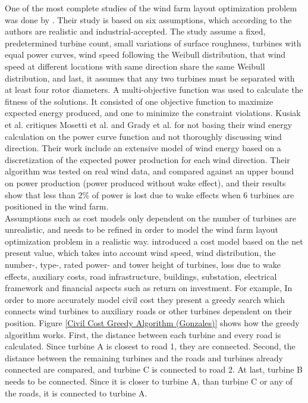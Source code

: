 \noindent One of the most complete studies of the wind farm layout optimization problem was done by \cite{Kusiak}. Their study is based on six assumptions, which according to the authors are realistic and industrial-accepted. The study assume a fixed, predetermined turbine count, small variations of surface roughness, turbines with equal power curves, wind speed following the Weibull distribution, that wind speed at different locations with same direction share the same Weibull distribution, and last, it assumes that any two turbines must be separated with at least four rotor diameters. A multi-objective function was used to calculate the fitness of the solutions. It consisted of one objective function to maximize expected energy produced, and one to minimize the constraint violations. Kusiak et al. critiques Mosetti et al. and Grady et al. for not basing their wind energy calculation on the power curve function and not thoroughly discussing wind direction. Their work include an extensive model of wind energy based on a discretization of the expected power production for each wind direction. Their algorithm was tested on real wind data, and compared against an upper bound on power production (power produced without wake effect), and their results show that less than 2\% of power is lost due to wake effects when 6 turbines are positioned in the wind farm. \\


\noindent Assumptions such as  cost models only dependent on the number of turbines are unrealistic, and needs to be refined in order to model the wind farm layout optimization problem in a realistic way. \cite{Gonzalez} introduced a cost model based on the net present value, which takes into account wind speed, wind distribution, the number-, type-, rated power- and tower height of turbines, loss due to wake effects, auxiliary costs, road infrastructure, buildings, substation, electrical framework and financial aspects such as return on investment. For example, In order to more accurately model civil cost they present a greedy search which connects wind turbines to auxiliary roads or other turbines dependent on their position. Figure \ref{Civil Cost Greedy Algorithm (Gonzales)} shows how the greedy algorithm works. First, the distance between each turbine and every road is calculated. Since turbine A is closest to road 1, they are connected. Second, the distance between the remaining turbines and the roads and turbines already connected are compared, and turbine C is connected to road 2. At last, turbine B needs to be connected. Since it is closer to turbine A, than turbine C or any of the roads, it is connected to turbine A.\\


